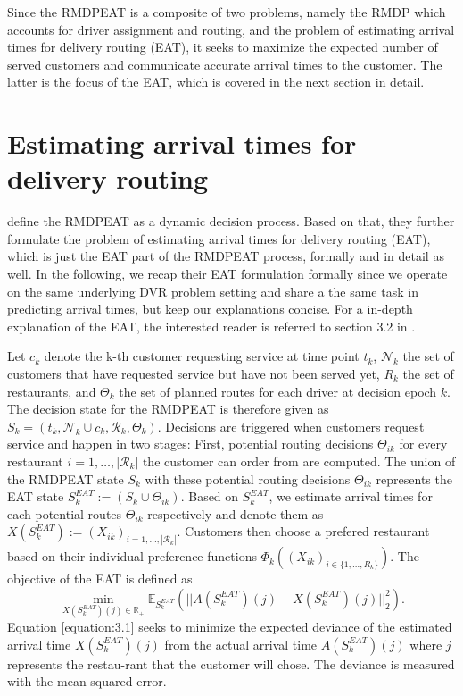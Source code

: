 Since the RMDPEAT is a composite of two problems, namely the RMDP which accounts for driver assignment and routing, and the problem of estimating arrival times for delivery routing (EAT), it seeks to maximize the expected number of served customers and communicate accurate arrival times to the customer. The latter is the focus of the EAT, which is covered in the next section in detail.

\section{Estimating arrival times for delivery routing}

\cite{Hildebrandt2020_EAT} define the RMDPEAT as a dynamic decision process. Based on that, they further formulate the problem of estimating arrival times for delivery routing (EAT), which is just the EAT part of the RMDPEAT process, formally and in detail as well. In the following, we recap their EAT formulation formally since we operate on the same underlying DVR problem setting and share a the same task in predicting arrival times, but keep our explanations concise. For a in-depth explanation of the EAT, the interested reader is referred to section 3.2 in \cite{Hildebrandt2020_EAT}. 

Let $ c_k $ denote the k-th customer requesting service at time point $ t_k $, $ \mathcal{N}_k $ the set of customers that have requested service but have not been served yet, $ R_k $ the set of restaurants, and $ \Theta_k $ the set of planned routes for each driver at decision epoch $ k $. The decision state for the RMDPEAT is therefore given as $ S_k = (t_k, \mathcal{N}_k \cup c_k, \mathcal{R}_k, \Theta_k) $. Decisions are triggered when customers request service and happen in two stages: First, potential routing decisions $ \Theta_{ik} $ for every restaurant $ i = 1, \dots, |\mathcal{R}_k| $ the customer can order from are computed. The union of the RMDPEAT state $ S_k $ with these potential routing decisions $ \Theta_{ik} $ represents the EAT state $ S^{EAT}_k := (S_k \cup \Theta_{ik})$. Based on $ S^{EAT}_k $, we estimate arrival times for each potential routes $ \Theta_{ik} $ respectively and denote them as $ X(S^{EAT}_k) := (X_{ik})_{i = 1, \dots, |\mathcal{R}_k|}$. Customers then choose a prefered restaurant based on their individual preference functions $ \Phi_k((X_{ik})_{i \in \{1,\dots, R_k\}}) $.  
The objective of the EAT is defined as
\begin{equation}\label{equation:3.1}
	\min_{X(S^{EAT}_k)(j) \in \mathbb{R}_+} 
	\mathbb{E}_{S^{EAT}_{k}} 
	(|| A(S^{EAT}_{k})(j) - X(S^{EAT}_{k})(j)||^{2}_{2}).
\end{equation}
Equation \ref{equation:3.1} seeks to minimize the expected deviance of the estimated arrival time $ X(S^{EAT}_{k})(j) $ from the actual arrival time $ A(S^{EAT}_{k})(j) $ where $ j $ represents the restau-rant that the customer will chose. The deviance is measured with the mean squared error.

    